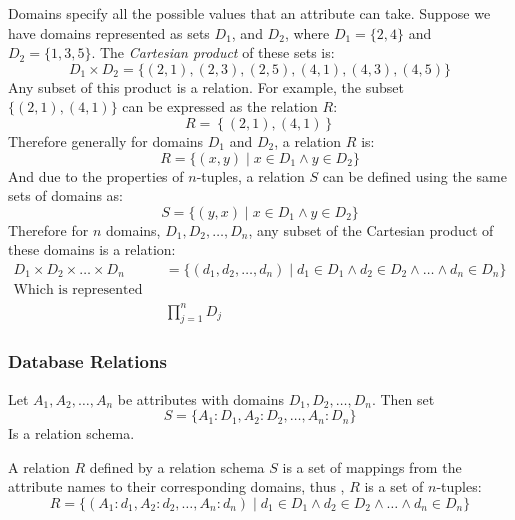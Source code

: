 \documentclass[12pt letter]{report}
\begin{document}
Domains specify all the possible values that an attribute can take.
Suppose we have domains represented as sets $D_1$, and $D_2$, where $D_1 = \{2, 4\} $ and $D_2 = \{1, 3, 5\} $. The
\textit{Cartesian product} of these sets is:
\[
  D_1 \times D_2 = \{ \left( 2,1 \right), \left( 2, 3 \right), \left( 2, 5
  \right), \left( 4, 1 \right), \left( 4, 3 \right), \left( 4, 5 \right)       \}
\]
Any subset of this product is a relation. For example, the subset $\{ \left( 2,1 \right), \left( 4,1 \right)   \} $ can
be expressed as the relation $R$:
\[
  R = \left\{ \left( 2,1 \right), \left( 4,1 \right) \right\}
\]
Therefore generally for domains $D_1$ and $D_2$, a relation $R$ is:
\[
  R = \{ \left( x, y \right)  \mid x \in D_1 \wedge y \in D_2  \}
\]
And due to the properties of $n$-tuples, a relation $S$ can be defined using the same sets of domains as:
\[
  S = \{ \left( y, x \right)  \mid x \in D_1 \wedge y \in D_2  \}
\]
Therefore for $n$ domains, $D_1, D_2, \ldots, D_n$, any subset of the Cartesian product of these domains is a relation:
\begin{align*}
  D_1 \times D_2 \times \ldots \times D_n & = \{ \left( d_1, d_2, \ldots, d_n \right)  \mid d_1 \in D_1 \wedge d_2 \in D_2
  \wedge \ldots \wedge d_n \in D_n \}                                                                                      \\
  \text{Which is represented as}          &
  \\
                                          & \prod_{j=1}^{n}  D_j
\end{align*}

\subsubsection{Database Relations}


Let $A_1, A_2,\ldots, A_n$ be attributes with domains $D_1, D_2, \ldots, D_n$. Then set
\[
  S = \{A_1:D_1, A_2:D_2, \ldots, A_n:D_n\}
\]
Is a relation schema.

A relation $R$ defined by a relation schema $S$ is a set of mappings from the attribute names to their corresponding
domains, thus , $R$ is a set of $n$-tuples:
\[
  R = \{ \left( A_1:d_1, A_2:d_2, \ldots, A_n:d_n \right)  \mid d_1 \in D_1 \wedge d_2 \in D_2 \wedge \ldots \wedge d_n
  \in D_n  \}
\]
\end{document}
